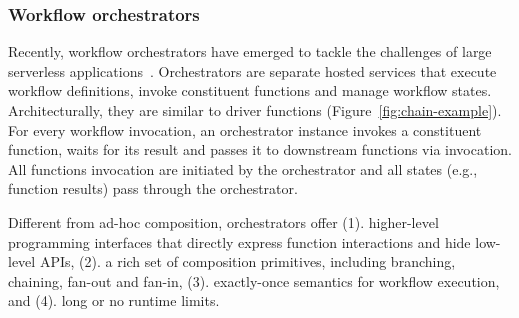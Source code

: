 

\subsubsection{Workflow orchestrators}

Recently, workflow orchestrators have emerged to tackle the challenges of
large serverless applications~\cite{excamera, gg-atc, aws-step-functions,
google-cloud-composer, google-workflows, durable-functions}. Orchestrators are
separate hosted services that execute workflow definitions, invoke constituent
functions and manage workflow states. Architecturally, they are similar to
driver functions (Figure~\ref{fig:chain-example}). For every workflow
invocation, an orchestrator instance invokes a constituent function, waits for
its result and passes it to downstream functions via invocation. All functions
invocation are initiated by the orchestrator and all states (e.g., function
results) pass through the orchestrator.

Different from ad-hoc composition, orchestrators offer (1). higher-level
programming interfaces that directly express function interactions and hide
low-level APIs, (2). a rich set of composition primitives, including
branching, chaining, fan-out and fan-in, (3). exactly-once semantics for
workflow execution, and (4). long or no runtime limits.

